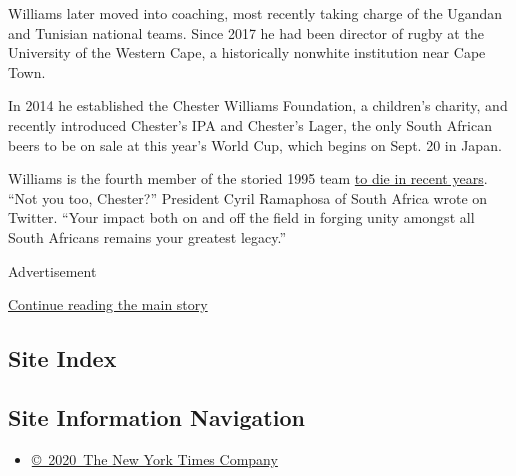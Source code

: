 Williams later moved into coaching, most recently taking charge of the
Ugandan and Tunisian national teams. Since 2017 he had been director of
rugby at the University of the Western Cape, a historically nonwhite
institution near Cape Town.

In 2014 he established the Chester Williams Foundation, a children's
charity, and recently introduced Chester's IPA and Chester's Lager, the
only South African beers to be on sale at this year's World Cup, which
begins on Sept. 20 in Japan.

Williams is the fourth member of the storied 1995 team
\href{https://www.nytimes3xbfgragh.onion/2017/02/07/sports/rugby/joost-van-der-westhuizen-dead-south-africa-rugby.html}{to
die in recent years}. ``Not you too, Chester?'' President Cyril
Ramaphosa of South Africa wrote on Twitter. ``Your impact both on and
off the field in forging unity amongst all South Africans remains your
greatest legacy.''

Advertisement

\protect\hyperlink{after-bottom}{Continue reading the main story}

\hypertarget{site-index}{%
\subsection{Site Index}\label{site-index}}

\hypertarget{site-information-navigation}{%
\subsection{Site Information
Navigation}\label{site-information-navigation}}

\begin{itemize}
\tightlist
\item
  \href{https://help.nytimes3xbfgragh.onion/hc/en-us/articles/115014792127-Copyright-notice}{©~2020~The
  New York Times Company}
\end{itemize}

